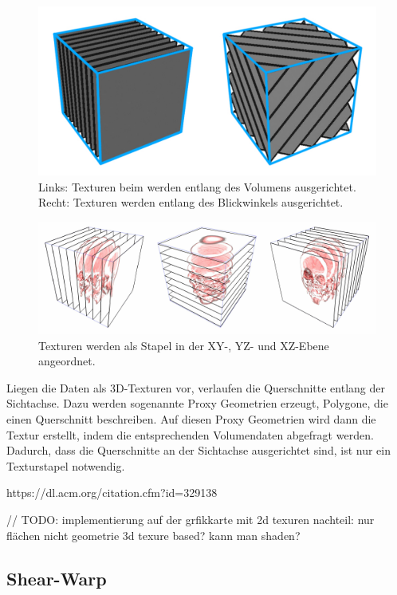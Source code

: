 \begin{figure}
	\centering
	\includegraphics[width=0.7\linewidth]{images/texture_2d3d.pdf}
	\caption{Links: Texturen beim werden entlang des Volumens ausgerichtet. Recht: Texturen werden entlang des Blickwinkels ausgerichtet.}
	\label{img:2D3DTex}
\end{figure}

\begin{figure}
	\centering
	\includegraphics[width=0.7\linewidth]{images/textureStacks.png}
	\caption{Texturen werden als Stapel in der 	XY-, YZ- und XZ-Ebene angeordnet.}
	\label{img:textureBased}
\end{figure}

Liegen die Daten als 3D-Texturen vor, verlaufen die Querschnitte entlang der Sichtachse. Dazu werden sogenannte Proxy Geometrien erzeugt, Polygone, die einen Querschnitt beschreiben. Auf diesen Proxy Geometrien wird dann die Textur erstellt, indem die entsprechenden Volumendaten abgefragt werden. Dadurch, dass die Querschnitte an der Sichtachse ausgerichtet sind, ist nur ein Texturstapel notwendig. 


https://dl.acm.org/citation.cfm?id=329138

// TODO:
implementierung auf der grfikkarte mit 2d texuren nachteil: nur flächen nicht geometrie
3d texure based? 	
kann man shaden?

\subsection{Shear-Warp}


